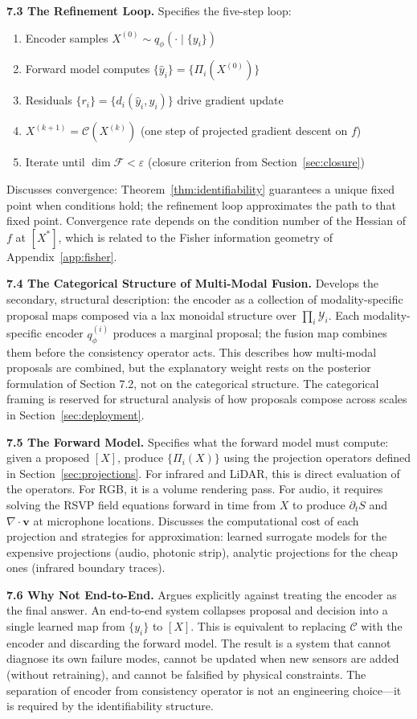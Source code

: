 \documentclass[12pt, oneside]{article}
\begin{document}
{\medskip
\textbf{7.3 The Refinement Loop.}
Specifies the five-step loop:
\begin{enumerate}
\item Encoder samples $X^{(0)} \sim q_\phi(\cdot \mid \{y_i\})$
\item Forward model computes $\{\hat{y}_i\} = \{\Pi_i(X^{(0)})\}$
\item Residuals $\{r_i\} = \{d_i(\hat{y}_i, y_i)\}$ drive gradient update
\item $X^{(k+1)} = \mathcal{C}(X^{(k)})$ (one step of projected gradient descent on $f$)
\item Iterate until $\dim \mathcal{F} < \varepsilon$ (closure criterion from
  Section~\ref{sec:closure})
\end{enumerate}
Discusses convergence: Theorem~\ref{thm:identifiability} guarantees a unique fixed point
when conditions hold; the refinement loop approximates the path to that fixed point.
Convergence rate depends on the condition number of the Hessian of $f$ at $[X^*]$, which
is related to the Fisher information geometry of Appendix~\ref{app:fisher}.

\medskip
\textbf{7.4 The Categorical Structure of Multi-Modal Fusion.}
Develops the secondary, structural description: the encoder as a collection of
modality-specific proposal maps composed via a lax monoidal structure over
$\prod_i \mathcal{Y}_i$. Each modality-specific encoder $q_\phi^{(i)}$ produces a
marginal proposal; the fusion map combines them before the consistency operator acts.
This describes how multi-modal proposals are combined, but the explanatory weight rests
on the posterior formulation of Section 7.2, not on the categorical structure. The
categorical framing is reserved for structural analysis of how proposals compose across
scales in Section~\ref{sec:deployment}.

\medskip
\textbf{7.5 The Forward Model.}
Specifies what the forward model must compute: given a proposed $[X]$, produce
$\{\Pi_i(X)\}$ using the projection operators defined in Section~\ref{sec:projections}.
For infrared and LiDAR, this is direct evaluation of the operators. For RGB, it is a
volume rendering pass. For audio, it requires solving the RSVP field equations forward in
time from $X$ to produce $\partial_t S$ and $\nabla \cdot \mathbf{v}$ at microphone
locations. Discusses the computational cost of each projection and strategies for
approximation: learned surrogate models for the expensive projections (audio, photonic
strip), analytic projections for the cheap ones (infrared boundary traces).

\medskip
\textbf{7.6 Why Not End-to-End.}
Argues explicitly against treating the encoder as the final answer. An end-to-end system
collapses proposal and decision into a single learned map from $\{y_i\}$ to $[X]$.
This is equivalent to replacing $\mathcal{C}$ with the encoder and discarding the
forward model. The result is a system that cannot diagnose its own failure modes, cannot
be updated when new sensors are added (without retraining), and cannot be falsified by
physical constraints. The separation of encoder from consistency operator is not an
engineering choice---it is required by the identifiability structure.
}
\end{document}
